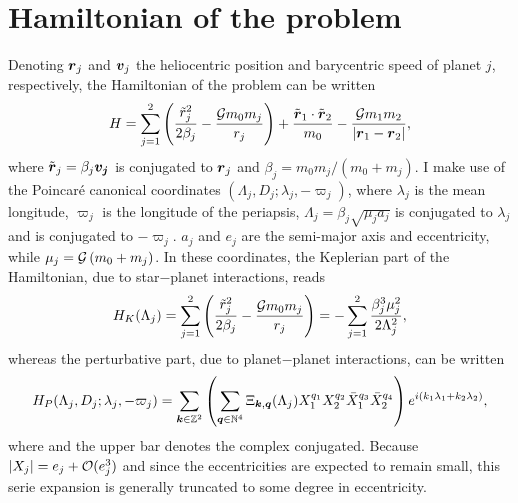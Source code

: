 \documentclass[12pt,a4paper,oneside]{article}
\begin{document}
\section{Hamiltonian of the problem}\label{sec:Hamiltonian}
Denoting $\mathbf{\boldsymbol{r}}_j$ and $\mathbf{\boldsymbol{v}}_j$ the heliocentric position and barycentric speed of planet $j$, respectively, the Hamiltonian of the problem can be written
\begin{equation}\label{Hamiltonian_original}
	H=\sum_{j=1}^{2}\left(\frac{\tilde{r}_j^2}{2\beta_j}-\frac{\mathcal{G} m_0m_j}{r_j}\right)+\frac{\tilde{\mathbf{\boldsymbol{r}}}_1\cdot\tilde{\mathbf{\boldsymbol{r}}}_2}{m_0}-\frac{\mathcal{G} m_1m_2}{\left|\mathbf{\boldsymbol{r}}_1-\mathbf{\boldsymbol{r}}_2\right|},
\end{equation}
where $\tilde{\mathbf{\boldsymbol{r}}}_j=\beta_j\mathbf{\boldsymbol{v_j}}$ is conjugated to $\mathbf{\boldsymbol{r}}_j$ and $\beta_j=m_0m_j/\left(m_0+m_j\right)$. I make use of the Poincar\'e canonical coordinates $\left(\Lambda_j,D_j;\lambda_j,-\varpi_j\right)$, where $\lambda_j$ is the mean longitude, $\varpi_j$ is the longitude of the periapsis, $\Lambda_j=\beta_j\sqrt{\mu_ja_j}$ is conjugated to $\lambda_j$ and  is conjugated to $-\varpi_j$. $a_j$ and $e_j$ are the semi-major axis and eccentricity, while $\mu_j=\mathcal{G}\left(m_0+m_j\right)$. In these coordinates, the Keplerian part of the Hamiltonian, due to star$-$planet interactions, reads
\begin{equation}
	H_K(\Lambda_j)=\sum_{j=1}^{2}\left(\frac{\tilde{r}_j^2}{2\beta_j}-\frac{\mathcal{G} m_0m_j}{r_j}\right)=-\sum_{j=1}^{2}\frac{\beta_j^3\mu_j^2}{2\Lambda_j^2},
\end{equation}
whereas the perturbative part, due to planet$-$planet interactions, can be written \citep{LaskarRobutel1995}
\begin{equation}\label{Hp}
	H_P(\Lambda_j,D_j;\lambda_j,-\varpi_j)=\sum_{\mathbf{\boldsymbol{k}}\in\mathbb{Z}^2}\left(\sum_{\mathbf{\boldsymbol{q}}\in\mathbb{N}^4}\Xi_{\mathbf{\boldsymbol{k}},\mathbf{\boldsymbol{q}}}(\Lambda_j)X_1^{q_1}X_2^{q_2}\bar{X}_1^{q_3}\bar{X}_2^{q_4}\right)e^{i\left(k_1\lambda_1+k_2\lambda_2\right)},
\end{equation}
where  and the upper bar denotes the complex conjugated. Because $|X_j|=e_j+\mathcal{O}(e_j^3)$ and since the eccentricities are expected to remain small, this serie expansion is generally truncated to some degree in eccentricity.
\end{document}
